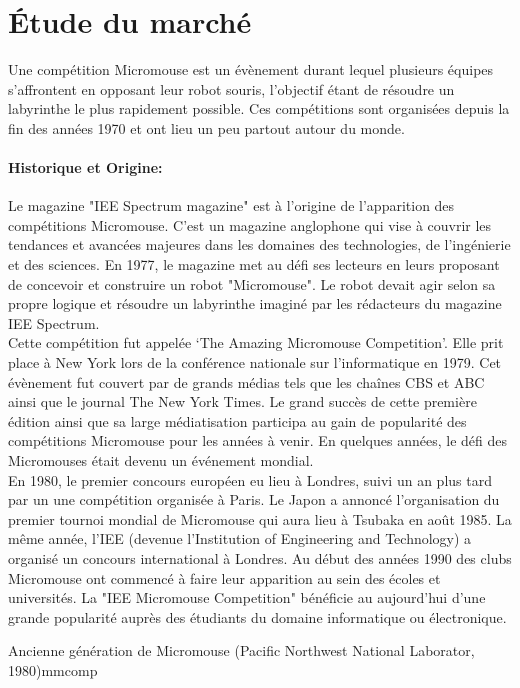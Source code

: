 \section{Étude du marché} \label{sec:etudeMarche}
Une compétition Micromouse est un évènement durant lequel plusieurs équipes
s'affrontent en opposant leur robot souris, l'objectif étant de résoudre un
labyrinthe le plus rapidement possible.  Ces compétitions sont organisées
depuis la fin des années 1970 et ont lieu un peu partout autour du monde.

\paragraph{Historique et Origine:} Le magazine "IEE Spectrum magazine" est à l'origine de l'apparition des compétitions Micromouse. C'est un magazine anglophone qui vise à couvrir les tendances et avancées majeures dans les domaines des technologies, de l'ingénierie et des sciences. En 1977, le magazine met au défi ses lecteurs en leurs proposant de concevoir et construire un robot "Micromouse". Le robot devait agir selon sa propre logique et résoudre un labyrinthe imaginé par les rédacteurs du magazine IEE Spectrum. 
\\

Cette compétition fut appelée ‘The Amazing Micromouse Competition’. Elle prit place à New York lors de la conférence nationale sur l'informatique en 1979.
Cet évènement fut couvert par de grands médias tels que les chaînes CBS et ABC ainsi que le journal The New York Times. Le grand succès de cette première édition ainsi que sa large médiatisation participa au gain de popularité des compétitions Micromouse pour les années à venir.  En quelques années, le défi des Micromouses était devenu un événement mondial. 
\\

En 1980, le premier concours européen eu lieu à Londres, suivi un an plus tard par un une compétition organisée à Paris. Le Japon a annoncé l'organisation du premier tournoi mondial
de Micromouse qui aura lieu à Tsubaka en août 1985. La même année, l'IEE
(devenue l'Institution of Engineering and Technology) a organisé un concours
international à Londres.  Au début des années 1990 des clubs Micromouse ont
commencé à faire leur apparition au sein des écoles et universités. La "IEE
Micromouse Competition" bénéficie au aujourd'hui d'une grande
popularité auprès des étudiants du domaine informatique ou électronique.
\newpage
    
{Ancienne génération de Micromouse (Pacific Northwest National Laborator, 1980)}{mmcomp}


